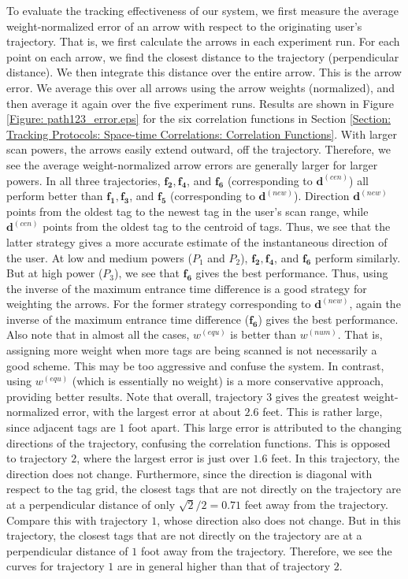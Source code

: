 To evaluate the tracking effectiveness of our system, we first measure the average weight-normalized error of an arrow with respect to the originating user's trajectory. That is, we first calculate the arrows in each experiment run.  For each point on each arrow, we find the closest distance to the trajectory (perpendicular distance).  We then integrate this distance over the entire arrow.  This is the arrow error.  We average this over all arrows using the arrow weights (normalized), and then average it again over the five experiment runs.  Results are shown in Figure \ref{Figure: path123_error.eps} for the six correlation functions in Section \ref{Section: Tracking Protocols: Space-time Correlations: Correlation Functions}. With larger scan powers, the arrows easily extend outward, off the trajectory. Therefore, we see the average weight-normalized arrow errors are generally larger for larger powers. In all three trajectories, $\mathbf{f_2}, \mathbf{f_4}$, and $\mathbf{f_6}$ (corresponding to $\mathbf{d}^{\left(cen\right)}$) all perform better than $\mathbf{f_1}, \mathbf{f_3}$, and $\mathbf{f_5}$ (corresponding to $\mathbf{d}^{\left(new\right)}$). Direction $\mathbf{d}^{\left(new\right)}$ points from the oldest tag to the newest tag in the user's scan range, while $\mathbf{d}^{\left(cen\right)}$ points from the oldest tag to the centroid of tags.  Thus, we see that the latter strategy gives a more accurate estimate of the instantaneous direction of the user.  At low and medium powers ($P_1$ and $P_2$), $\mathbf{f_2}, \mathbf{f_4}$, and $\mathbf{f_6}$ perform similarly.  But at high power ($P_3$), we see that $\mathbf{f_6}$ gives the best performance.  Thus, using the inverse of the maximum entrance time difference is a good strategy for weighting the arrows. For the former strategy corresponding to $\mathbf{d}^{\left(new\right)}$, again the inverse of the maximum entrance time difference ($\mathbf{f_6}$) gives the best performance. Also note that in almost all the cases, $w^{\left(equ\right)}$ is better than $w^{\left(num\right)}$. That is, assigning more weight when more tags are being scanned is not necessarily a good scheme. This may be too aggressive and confuse the system. In contrast, using $w^{\left(equ\right)}$ (which is essentially no weight) is a more conservative approach, providing better results. Note that overall, trajectory $3$ gives the greatest weight-normalized error, with the largest error at about $2.6$ feet. This is rather large, since adjacent tags are $1$ foot apart. This large error is attributed to the changing directions of the trajectory, confusing the correlation functions. This is opposed to trajectory $2$, where the largest error is just over $1.6$ feet. In this trajectory, the direction does not change. Furthermore, since the direction is diagonal with respect to the tag grid, the closest tags that are not directly on the trajectory are at a perpendicular distance of only $\sqrt{2}/2 = 0.71$ feet away from the trajectory. Compare this with trajectory $1$, whose direction also does not change. But in this trajectory, the closest tags that are not directly on the trajectory are at a perpendicular distance of $1$ foot away from the trajectory. Therefore, we see the curves for trajectory $1$ are in general higher than that of trajectory $2$.

